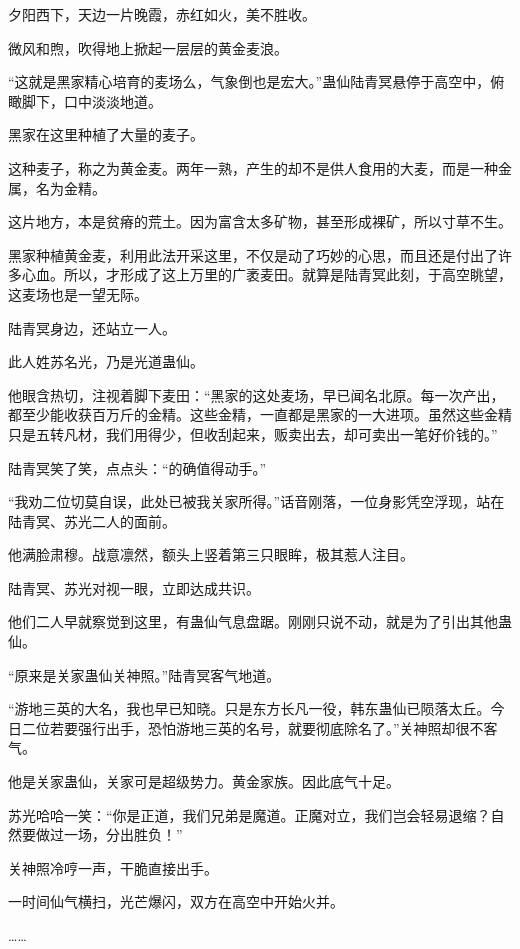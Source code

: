 
\begin{this_body}

夕阳西下，天边一片晚霞，赤红如火，美不胜收。

微风和煦，吹得地上掀起一层层的黄金麦浪。

“这就是黑家精心培育的麦场么，气象倒也是宏大。”蛊仙陆青冥悬停于高空中，俯瞰脚下，口中淡淡地道。

黑家在这里种植了大量的麦子。

这种麦子，称之为黄金麦。两年一熟，产生的却不是供人食用的大麦，而是一种金属，名为金精。

这片地方，本是贫瘠的荒土。因为富含太多矿物，甚至形成裸矿，所以寸草不生。

黑家种植黄金麦，利用此法开采这里，不仅是动了巧妙的心思，而且还是付出了许多心血。所以，才形成了这上万里的广袤麦田。就算是陆青冥此刻，于高空眺望，这麦场也是一望无际。

陆青冥身边，还站立一人。

此人姓苏名光，乃是光道蛊仙。

他眼含热切，注视着脚下麦田：“黑家的这处麦场，早已闻名北原。每一次产出，都至少能收获百万斤的金精。这些金精，一直都是黑家的一大进项。虽然这些金精只是五转凡材，我们用得少，但收刮起来，贩卖出去，却可卖出一笔好价钱的。”

陆青冥笑了笑，点点头：“的确值得动手。”

“我劝二位切莫自误，此处已被我关家所得。”话音刚落，一位身影凭空浮现，站在陆青冥、苏光二人的面前。

他满脸肃穆。战意凛然，额头上竖着第三只眼眸，极其惹人注目。

陆青冥、苏光对视一眼，立即达成共识。

他们二人早就察觉到这里，有蛊仙气息盘踞。刚刚只说不动，就是为了引出其他蛊仙。

“原来是关家蛊仙关神照。”陆青冥客气地道。

“游地三英的大名，我也早已知晓。只是东方长凡一役，韩东蛊仙已陨落太丘。今日二位若要强行出手，恐怕游地三英的名号，就要彻底除名了。”关神照却很不客气。

他是关家蛊仙，关家可是超级势力。黄金家族。因此底气十足。

苏光哈哈一笑：“你是正道，我们兄弟是魔道。正魔对立，我们岂会轻易退缩？自然要做过一场，分出胜负！”

关神照冷哼一声，干脆直接出手。

一时间仙气横扫，光芒爆闪，双方在高空中开始火并。

……


\end{this_body}
